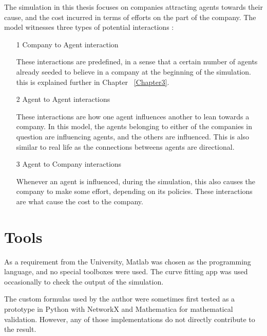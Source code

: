 The simulation in this thesis focuses on companies attracting agents towards their cause, and the cost incurred in terms of efforts on the part of the company.
The model witnesses three types of potential interactions : 
\begin{enumerate}
\item[1] Company to Agent interaction 

These interactions are predefined, in a sense that a certain number of agents already seeded to believe in a company at the beginning of the simulation. this is explained further in Chapter ~\ref{Chapter3}.

\item[2] Agent to Agent interactions

These interactions are how one agent influences another to lean towards a company. In this model, the agents belonging to either of the companies in question are influencing agents, and the others are influenced. This is also similar to real life as the connections betweens agents are directional.

\item[3] Agent to Company interactions

Whenever an agent is influenced, during the simulation, this also causes the company to make some effort, depending on its policies. These interactions are what cause the cost to the company.


\end{enumerate}





\section{Tools}
As a requirement from the University, Matlab was chosen as the programming language, and no special toolboxes were used.
The curve fitting app was used occasionally to check the output of the simulation.

The custom formulas used by the author were sometimes first tested as a prototype in Python with NetworkX and Mathematica for mathematical validation. However, any of those implementations do not directly contribute to the result.
